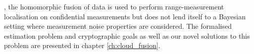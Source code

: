 \cite{alanwarPrOLocResilientLocalization2017}, the homomorphic fusion of data is used to perform range-measurement localisation on confidential measurements but does not lend itself to a Bayesian setting where measurement noise properties are considered. The formalised estimation problem and cryptographic goals as well as our novel solutions to this problem are presented in chapter \ref{ch:cloud_fusion}.

% 
% 

